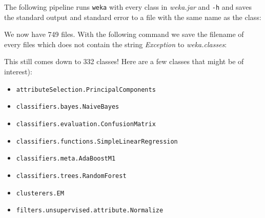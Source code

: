 \documentclass[
]{book}
\newenvironment{Shaded}{\begin{snugshade}}{\end{snugshade}}
\newcommand{\ExtensionTok}[1]{#1}
\newcommand{\FunctionTok}[1]{\textcolor[rgb]{0.00,0.00,0.00}{#1}}
\newcommand{\KeywordTok}[1]{\textcolor[rgb]{0.13,0.29,0.53}{\textbf{#1}}}
\newcommand{\NormalTok}[1]{#1}
\newcommand{\OperatorTok}[1]{\textcolor[rgb]{0.81,0.36,0.00}{\textbf{#1}}}
\newcommand{\StringTok}[1]{\textcolor[rgb]{0.31,0.60,0.02}{#1}}
\newcommand{\VariableTok}[1]{\textcolor[rgb]{0.00,0.00,0.00}{#1}}
\theoremstyle{definition}
\theoremstyle{definition}
\theoremstyle{definition}
\theoremstyle{remark}
\begin{document}
The following pipeline runs \texttt{weka} with every class in \emph{weka.jar} and \texttt{-h} and saves the standard output and standard error to a file with the same name as the class:

\begin{Shaded}
\end{Shaded}

We now have 749 files. With the following command we save the filename of every files which does not contain the string \emph{Exception} to \emph{weka.classes}:

\begin{Shaded}
\end{Shaded}

This still comes down to 332 classes! Here are a few classes that might be of interest):

\begin{itemize}
\item
  \texttt{attributeSelection.PrincipalComponents}
\item
  \texttt{classifiers.bayes.NaiveBayes}
\item
  \texttt{classifiers.evaluation.ConfusionMatrix}
\item
  \texttt{classifiers.functions.SimpleLinearRegression}
\item
  \texttt{classifiers.meta.AdaBoostM1}
\item
  \texttt{classifiers.trees.RandomForest}
\item
  \texttt{clusterers.EM}
\item
  \texttt{filters.unsupervised.attribute.Normalize}
\end{itemize}
\end{document}
